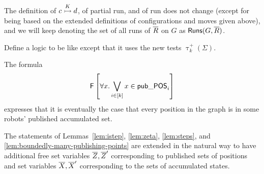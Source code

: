 The definition of $\onestep{c}{d}{K}$, of partial run, and of run does not change (except for being based on the extended definitions of configurations and moves given above), and we will keep denoting the set of all runs of $\tup{R}$ on $G$ as $\runs(G,\tup{R})$.



 Define a logic \RLTLV to be like \RLTL except that it uses the new tests $\uptau^+_k(\Sigma)$.

\begin{example}
The \RLTLV formula
\[
 \eventually \left[ \forall x. \bigvee_{i \in [k]} x \in \VARBCPOS_i \right]
\]
expresses that it is eventually the case that every position in the graph is in some robots' published accumulated set. 
\end{example}

 The statements of Lemmas~\ref{lem:istep}, \ref{lem:zeta}, \ref{lem:steps}, and \ref{lem:boundedly-many-publishing-points} are extended in the natural way to have additional free set variables $\tup{Z},\tup{Z}'$
corresponding to published sets of positions and set variables $\tup{X},\tup{X}'$ corresponding to the sets of accumulated states.


